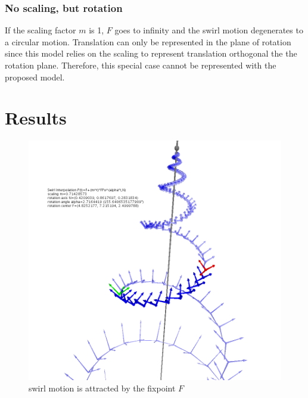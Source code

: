 \documentclass[tikz, journal, letterpaper]{IEEEtran}
\begin{document}
\subsubsection{No scaling, but rotation}
If the scaling factor $m$ is 1, $F$ goes to infinity and the swirl motion degenerates to a circular motion. Translation can only be represented in the plane of rotation since this model relies on the scaling to represent translation orthogonal the the rotation plane. Therefore, this special case cannot be represented with the proposed model.

\section{Results}

\begin{figure}
	\centering
		\includegraphics[scale=0.4]{pictures/P3.png}
	\caption{swirl motion is attracted by the fixpoint $F$}
	\label{fig:P3}
\end{figure}
\end{document}
